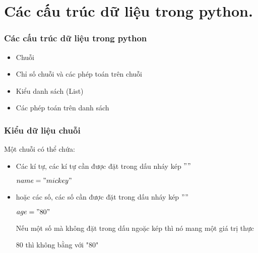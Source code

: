 \documentclass{beamer}
\begin{document}
\section{Các cấu trúc dữ liệu trong python.}
\begin{frame}[label=cautrucdulieu]
\frametitle{Các cấu trúc dữ liệu trong python}

\begin{itemize}
\item Chuỗi \hyperlink{string}{\beamerbutton{$\unrhd$}}
\item Chỉ số chuỗi và các phép toán trên chuỗi \hyperlink{stringoper}{\beamerbutton{$\unrhd$}}
\item Kiểu danh sách (List)  \hyperlink{list}{\beamerbutton{$\unrhd$}}
\item Các phép toán trên danh sách  \hyperlink{listoper}{\beamerbutton{$\unrhd$}}
\end{itemize}

\hyperlink{intro}{}
\hyperlink{luanly}{}
\end{frame}

\begin{frame}[label=string]
\frametitle{Kiểu dữ liệu chuỗi }
Một chuỗi có thể chứa:
\begin{itemize}
\item Các kí tự, các kí tự cần được đặt trong dấu nháy kép $""$
\begin{example}
$name = "mickey"$ 
\end{example} 
\item hoặc các số, các số cần được đặt trong dấu nháy kép $""$
\begin{example}
$age = "80"$
\end{example} 
 Nếu một số mà không đặt trong dấu ngoặc kép thì nó mang một giá trị thực
\begin{example}
80 thì không bằng với "80"
\end{example} 
\end{itemize}
\hyperlink{cautrucdulieu}{}
\end{frame}
\end{document}
